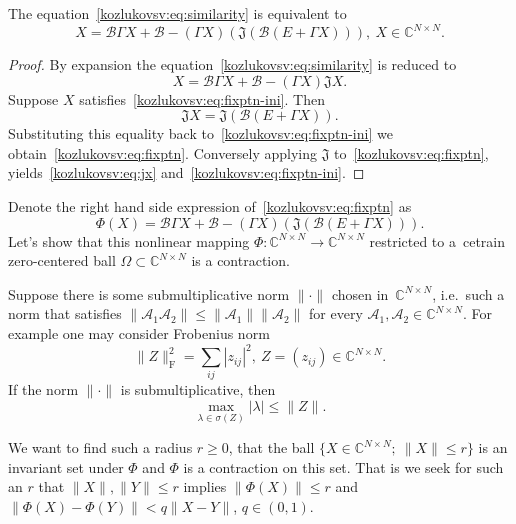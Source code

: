 \begin{lem}
    The equation~\eqref{kozlukovsv:eq:similarity} is equivalent to
    \begin{equation}\label{kozlukovsv:eq:fixptn}
        X = \mathcal{B} \Gamma X + \mathcal{B} - (\Gamma X)(\mathfrak{J}(\mathcal{B} (E + \Gamma X))),\ X\in\mathbb{C}^{N{\times}N}.
    \end{equation}
\end{lem}
\begin{proof}
By expansion the equation~\eqref{kozlukovsv:eq:similarity} is reduced to
\begin{equation}\label{kozlukovsv:eq:fixptn-ini}
    X = \mathcal{B} \Gamma X + \mathcal{B} - (\Gamma X) \mathfrak{J} X.
\end{equation}
Suppose \( X \) satisfies~\eqref{kozlukovsv:eq:fixptn-ini}.
Then
    \begin{equation}\label{kozlukovsv:eq:jx}
        \mathfrak{J} X = \mathfrak{J}(\mathcal{B} (E + \Gamma X)).
    \end{equation}
Substituting this equality back to~\eqref{kozlukovsv:eq:fixptn-ini}
    we obtain~\eqref{kozlukovsv:eq:fixptn}.
Conversely applying \( \mathfrak{J} \) to~\eqref{kozlukovsv:eq:fixptn},
    yields~\eqref{kozlukovsv:eq:jx} and~\eqref{kozlukovsv:eq:fixptn-ini}.
\end{proof}

Denote the right hand side expression of~\eqref{kozlukovsv:eq:fixptn} as
\[
    \Phi(X) = \mathcal{B} \Gamma X + \mathcal{B} - (\Gamma X)(\mathfrak{J}(\mathcal{B} (E + \Gamma X))).
    \]
Let's show that
    this nonlinear mapping \( \Phi:\mathbb{C}^{N{\times}N}{\to}\mathbb{C}^{N{\times}N} \)
    restricted to a~cetrain zero-centered ball \( \Omega \subset \mathbb{C}^{N{\times}N} \)
    is a contraction.

Suppose there is some submultiplicative norm \( \|\cdot\| \) chosen in~\( \mathbb{C}^{N{\times}N} \),
    i.e.\ such a norm that satisfies
    \( \| \mathcal{A}_1\mathcal{A}_2 \| \leq \|\mathcal{A}_1\|\|\mathcal{A}_2\| \)
    for every \( \mathcal{A}_1, \mathcal{A}_2 \in \mathbb{C}^{N{\times}N} \).
For example one may consider Frobenius norm
\[
    \|Z\|_{\mathrm{F}}^2 = \sum_{ij}|z_{ij}|^2,\ Z=(z_{ij})\in\mathbb{C}^{N{\times}N}.
    \]
If the norm \( \|\cdot\| \) is submultiplicative,
    then
\[
    \max_{\lambda\in\sigma(Z)}|\lambda| \leq \|Z\|.
    \]


We want to find such a radius \( r \geq 0 \),
    that the ball \( \{ X{\in}\mathbb{C}^{N{\times}N};\ \|X\|{\leq}r \} \)
    is an invariant set under \( \Phi \)
    and \( \Phi \) is a contraction on this set.
That is we seek for such an \( r \)
    that \( \|X\|,\|Y\| \leq r \) implies \( \|\Phi(X)\| \leq r \)
and~\( \|\Phi(X) - \Phi(Y)\| < q\|X-Y\| \), \( q\in(0,1) \).

